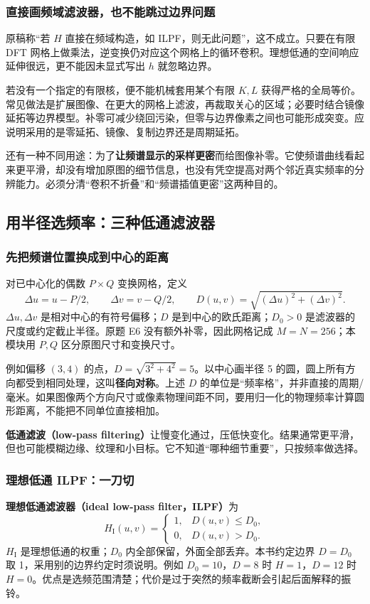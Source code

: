 \subsubsection{直接画频域滤波器，也不能跳过边界问题}
原稿称“若 $H$ 直接在频域构造，如 ILPF，则无此问题”，这不成立。只要在有限 DFT 网格上做乘法，逆变换仍对应这个网格上的循环卷积。理想低通的空间响应延伸很远，更不能因未显式写出 $h$ 就忽略边界。

若没有一个指定的有限核，便不能机械套用某个有限 $K,L$ 获得严格的全局等价。常见做法是扩展图像、在更大的网格上滤波，再裁取关心的区域；必要时结合镜像延拓等边界模型。补零可减少绕回污染，但零与边界像素之间也可能形成突变。应说明采用的是零延拓、镜像、复制边界还是周期延拓。

还有一种不同用途：为了\textbf{让频谱显示的采样更密}而给图像补零。它使频谱曲线看起来更平滑，却没有增加原图的细节信息，也没有凭空提高对两个邻近真实频率的分辨能力。必须分清“卷积不折叠”和“频谱插值更密”这两种目的。

\subsection{用半径选频率：三种低通滤波器}

\subsubsection{先把频谱位置换成到中心的距离}
对已中心化的偶数 $P\times Q$ 变换网格，定义
\[
\Delta u=u-P/2,\qquad \Delta v=v-Q/2,
\qquad D(u,v)=\sqrt{(\Delta u)^2+(\Delta v)^2}.
\]
$\Delta u,\Delta v$ 是相对中心的有符号偏移；$D$ 是到中心的欧氏距离；$D_0>0$ 是滤波器的尺度或约定截止半径。原题 E6 没有额外补零，因此网格记成 $M=N=256$；本模块用 $P,Q$ 区分原图尺寸和变换尺寸。

例如偏移 $(3,4)$ 的点，$D=\sqrt{3^2+4^2}=5$。以中心画半径 5 的圆，圆上所有方向都受到相同处理，这叫\textbf{径向对称}。上述 $D$ 的单位是“频率格”，并非直接的周期/毫米。如果图像两个方向尺寸或像素物理间距不同，要用归一化的物理频率计算圆形距离，不能把不同单位直接相加。

\textbf{低通滤波（low-pass filtering）}让慢变化通过，压低快变化。结果通常更平滑，但也可能模糊边缘、纹理和小目标。它不知道“哪种细节重要”，只按频率做选择。

\subsubsection{理想低通 ILPF：一刀切}
\textbf{理想低通滤波器（ideal low-pass filter，ILPF）}为
\[
H_{\mathrm I}(u,v)=
\begin{cases}
1,&D(u,v)\leq D_0,\\
0,&D(u,v)>D_0.
\end{cases}
\]
$H_{\mathrm I}$ 是理想低通的权重；$D_0$ 内全部保留，外面全部丢弃。本书约定边界 $D=D_0$ 取 1，采用别的边界约定时须说明。例如 $D_0=10$，$D=8$ 时 $H=1$，$D=12$ 时 $H=0$。优点是选频范围清楚；代价是过于突然的频率截断会引起后面解释的振铃。

